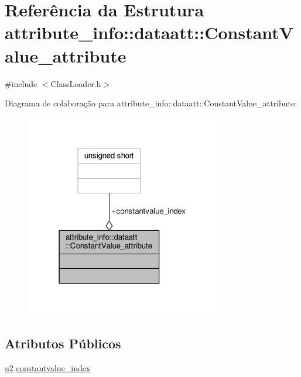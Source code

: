 \hypertarget{structattribute__info_1_1dataatt_1_1ConstantValue__attribute}{}\section{Referência da Estrutura attribute\+\_\+info\+:\+:dataatt\+:\+:Constant\+Value\+\_\+attribute}
\label{structattribute__info_1_1dataatt_1_1ConstantValue__attribute}


{\ttfamily \#include $<$Class\+Loader.\+h$>$}



Diagrama de colaboração para attribute\+\_\+info\+:\+:dataatt\+:\+:Constant\+Value\+\_\+attribute\+:\nopagebreak
\begin{figure}[H]
\begin{center}
\leavevmode
\includegraphics[width=243pt]{structattribute__info_1_1dataatt_1_1ConstantValue__attribute__coll__graph}
\end{center}
\end{figure}
\subsection*{Atributos Públicos}
\begin{DoxyCompactItemize}
\item 
\hyperlink{ClassLoader_8h_a5f223212eef04d10a4550ded680cb1cf}{u2} \hyperlink{structattribute__info_1_1dataatt_1_1ConstantValue__attribute_ac3d5541cf499281fbc9718155cf048fe}{constantvalue\+\_\+index}
\end{DoxyCompactItemize}


